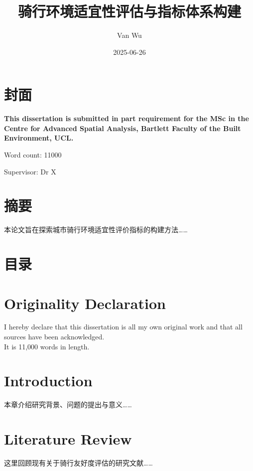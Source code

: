 \documentclass[
]{book}
\title{骑行环境适宜性评估与指标体系构建}
\author{Van Wu}
\date{2025-06-26}
\begin{document}
\maketitle

{
\setcounter{tocdepth}{1}
\tableofcontents
}
\chapter*{封面}\label{ux5c01ux9762}

\textbf{This dissertation is submitted in part requirement for the MSc in the Centre for Advanced Spatial Analysis, Bartlett Faculty of the Built Environment, UCL.}

Word count: 11000

Supervisor: Dr X

\chapter*{摘要}\label{ux6458ux8981}

本论文旨在探索城市骑行环境适宜性评价指标的构建方法\ldots\ldots{}

\chapter*{目录}\label{ux76eeux5f55}

\tableofcontents

\chapter*{Originality Declaration}\label{originality-declaration}

I hereby declare that this dissertation is all my own original work and that all sources have been acknowledged.\\
It is 11,000 words in length.

\chapter{Introduction}\label{introduction}

本章介绍研究背景、问题的提出与意义\ldots\ldots{}

\chapter{Literature Review}\label{literature-review}

这里回顾现有关于骑行友好度评估的研究文献\ldots\ldots{}


\end{document}
